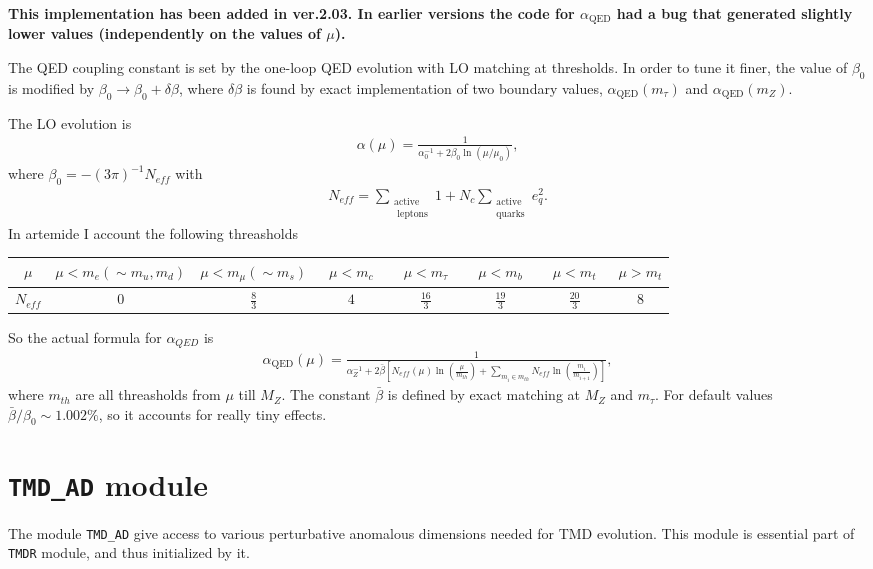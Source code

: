 \documentclass[prd,nofootinbib,eqsecnum,final]{revtex4}
\renewcommand{\(}{\left(}
\renewcommand{\)}{\right)}
\renewcommand{\[}{\left[}
\renewcommand{\]}{\right]}
\begin{document}
\textbf{This implementation has been added in ver.2.03. In earlier versions the code for $\alpha_{\text{QED}}$ had a bug that generated slightly lower values (independently on the values of $\mu$).}

The QED coupling constant is set by the one-loop QED evolution with LO matching at thresholds. In order to tune it finer, the value of $\beta_0$ is modified by $\beta_0\to \beta_0+\delta \beta$, where $\delta \beta$ is found by exact implementation of two boundary values, $\alpha_{\text{QED}}(m_\tau)$ and $\alpha_{\text{QED}}(m_Z)$. 

The LO evolution is
\begin{eqnarray}
\alpha(\mu)=\frac{1}{\alpha_0^{-1}+2\beta_0 \ln(\mu/\mu_0)},
\end{eqnarray}
where $\beta_0=-(3\pi)^{-1}N_{eff}$ with 
\begin{eqnarray}
N_{eff}=\sum_{\substack{\text{active}\\\text{ leptons}}}1+N_c\sum_{\substack{\text{active}\\\text{quarks}}}e_q^2.
\end{eqnarray}
In artemide I account the following threasholds
\begin{center}
\begin{tabular}{c||c|c|c|c|c|c|c|}
$\mu$   & $\mu<m_e(\sim m_u,m_d)$ & $\mu<m_\mu(\sim m_s)$ & ~$\mu<m_c$~ & ~$\mu<m_\tau$~ & ~$\mu<m_b$~ & ~$\mu<m_t$~ & $\mu>m_t$
\\\hline
$N_{eff}$& 0 & $\frac{8}{3}$ & $4$ & $\frac{16}{3}$ & $\frac{19}{3}$ & $\frac{20}{3}$ & $8$ 
\end{tabular}
\end{center}
So the actual formula for $\alpha_{QED}$ is
\begin{eqnarray}
\alpha_{\text{QED}}(\mu)=\frac{1}{\alpha_Z^{-1}+2\bar \beta\[N_{eff}(\mu)\ln\(\frac{\mu}{m_{th}}\)+\sum_{m_i\in m_{th}} N_{eff}\ln\(\frac{m_{i}}{m_{i+1}}\)\]},
\end{eqnarray}
where $m_{th}$ are all threasholds from $\mu$ till $M_Z$. The constant $\bar \beta$ is defined by exact matching at $M_Z$ and $m_\tau$. For default values $\bar\beta/\beta_0\sim 1.002\%$, so it accounts for really tiny effects.

\newpage

\section{\texttt{TMD\_AD} module}
\label{TMD_AD}

The module \texttt{TMD\_AD} give access to various perturbative anomalous dimensions needed for TMD evolution. This module is essential part of \texttt{TMDR} module, and thus initialized by it.
\end{document}
